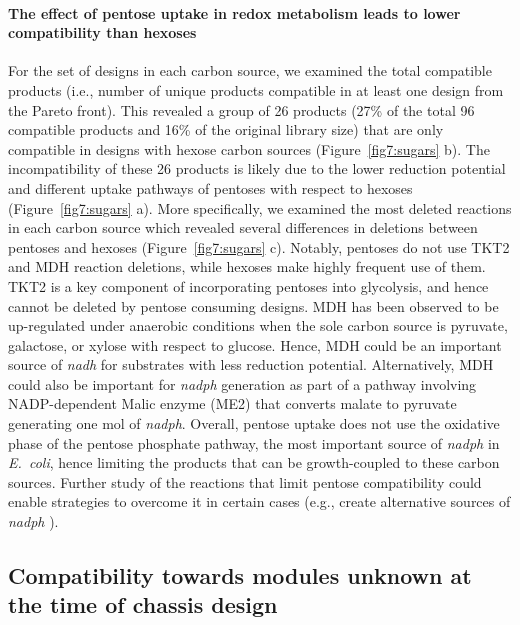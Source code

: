 {\paragraph{The effect of pentose uptake in redox metabolism leads to lower compatibility than hexoses}
For the set of designs in each carbon source, we examined the total compatible products (i.e., number of unique products compatible in at least one design from the Pareto front).
This revealed a group of 26 products (27\% of the total 96 compatible products and 16\% of the original library size) that are only compatible in designs with hexose carbon sources  (Figure~\ref{fig7:sugars} b).
The incompatibility of these 26 products is likely due to the
 lower reduction potential and different uptake pathways of pentoses with respect to hexoses (Figure~\ref{fig7:sugars} a).
More specifically, we examined the most deleted reactions in each carbon source which revealed several differences in deletions between pentoses and hexoses (Figure~\ref{fig7:sugars} c).
Notably, pentoses do not use TKT2 and MDH reaction deletions, while hexoses make highly frequent use of them.
TKT2 is a key component of incorporating pentoses into glycolysis, and hence cannot be deleted by pentose consuming designs.
MDH  has been observed to be up-regulated under anaerobic conditions when the sole carbon source is pyruvate, galactose, or xylose with respect to glucose.\citep{park1995}
Hence, MDH could be an important source of \textit{nadh} for substrates with less reduction potential. %
Alternatively, MDH could also be important for \textit{nadph} generation as part of a pathway involving NADP-dependent Malic enzyme (ME2) that converts malate to pyruvate generating one mol of \textit{nadph}.
Overall, pentose uptake does not use the oxidative phase of the pentose phosphate pathway, the most important source of \textit{nadph} in \textit{E.~coli},\citep{christodoulou2018}
hence limiting the products that can be growth-coupled to these carbon sources.
Further study of the reactions that limit pentose compatibility could enable strategies to overcome it in certain cases (e.g., create alternative sources of \textit{nadph} \citep{lee2013, ng2015c}).


\subsection{Compatibility towards modules unknown at the time of chassis design}

}
